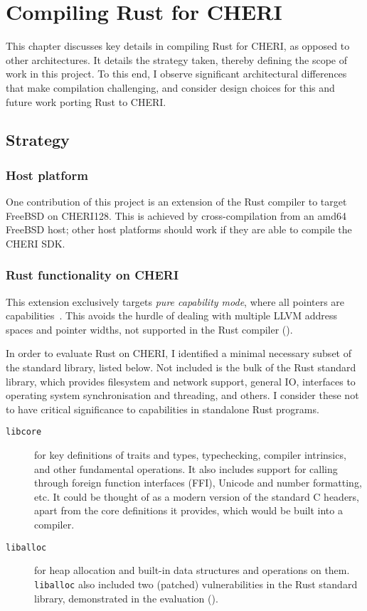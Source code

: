 \documentclass[dissertation.tex]{subfiles}
\begin{document}
\chapter{Compiling Rust for CHERI}
\label{ch:impl}


This chapter discusses key details in compiling Rust for CHERI, as
opposed to other architectures.
It details the strategy taken, thereby defining the scope of work in
this project.
To this end, I observe significant architectural differences that make
compilation challenging, and consider design choices for this and future
work porting Rust to CHERI.


\section{Strategy}
\label{sec:impl-what}

\subsection{Host platform}
One contribution of this project is an extension of the Rust compiler to
target FreeBSD on CHERI128.
This is achieved by cross-compilation from an amd64 FreeBSD host; other
host platforms should work if they are able to compile the CHERI SDK.

\subsection{Rust functionality on CHERI}
This extension exclusively targets \emph{pure capability mode}, where
all pointers are capabilities~\cite{cheri-prog-guide}.
This avoids the hurdle of dealing with multiple LLVM address spaces and
pointer widths, not supported in the Rust compiler
().

In order to evaluate Rust on CHERI, I identified
a minimal necessary subset of the standard library, listed below.
Not included is the bulk of the Rust standard library, which provides
filesystem and network support, general IO, interfaces to operating
system synchronisation and threading, and others.
I consider these not to have critical significance to capabilities in
standalone Rust programs.

\begin{description}
    \item[\texttt{libcore}] for key definitions of traits and types,
    typechecking, compiler intrinsics, and other fundamental operations.
    It also includes support for calling through foreign function
    interfaces (FFI), Unicode and number formatting, etc.
    It could be thought of as a modern version of the standard C
    headers, apart from the core definitions it provides, which would be
    built into a compiler.
    \item[\texttt{liballoc}] for heap allocation and built-in data
    structures and operations on them.
    \texttt{liballoc} also included two (patched) vulnerabilities in the
    Rust standard library, demonstrated in the evaluation
    ().
\end{description}
\end{document}
